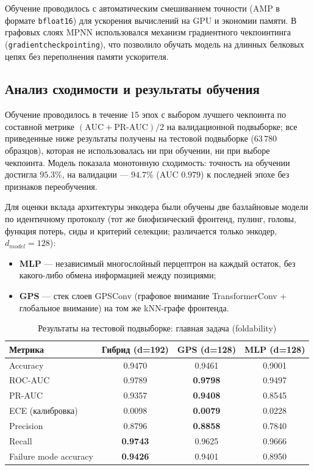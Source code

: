 \documentclass[12pt, a4paper]{article}
\begin{document}
Обучение проводилось с автоматическим смешиванием точности (AMP в формате \texttt{bfloat16}) для ускорения вычислений на GPU и экономии памяти. В графовых слоях MPNN использовался механизм градиентного чекпоинтинга (\texttt{gradient}\-\texttt{checkpointing}), что позволило обучать модель на длинных белковых цепях без переполнения памяти ускорителя.

\subsection{Анализ сходимости и результаты обучения}
Обучение проводилось в течение 15 эпох с выбором лучшего чекпоинта по составной метрике $(\mathrm{AUC} + \mathrm{PR\text{-}AUC})/2$ на валидационной подвыборке; все приведенные ниже результаты получены на тестовой подвыборке ($63\,780$ образцов), которая не использовалась ни при обучении, ни при выборе чекпоинта. Модель показала монотонную сходимость: точность на обучении достигла $95.3\%$, на валидации --- $94.7\%$ (AUC $0.979$) к последней эпохе без признаков переобучения.

Для оценки вклада архитектуры энкодера были обучены две базлайновые модели по идентичному протоколу (тот же биофизический фронтенд, пулинг, головы, функция потерь, сиды и критерий селекции; различается только энкодер, $d_{model}=128$):
\begin{itemize}
    \item \textbf{MLP} --- независимый многослойный перцептрон на каждый остаток, без какого-либо обмена информацией между позициями;
    \item \textbf{GPS} --- стек слоев GPSConv (графовое внимание TransformerConv + глобальное внимание) на том же kNN-графе фронтенда.
\end{itemize}

\begin{table}[h]
\centering
\caption{Результаты на тестовой подвыборке: главная задача (foldability)}
\label{tab:test_results}
\begin{tabular}{lccc}
\toprule
\textbf{Метрика} & \textbf{Гибрид (d=192)} & \textbf{GPS (d=128)} & \textbf{MLP (d=128)} \\
\midrule
Accuracy & 0.9470 & 0.9461 & 0.9001 \\
ROC-AUC & 0.9789 & \textbf{0.9798} & 0.9497 \\
PR-AUC & 0.9357 & \textbf{0.9408} & 0.8545 \\
ECE (калибровка) & 0.0098 & \textbf{0.0079} & 0.0228 \\
Precision & 0.8796 & \textbf{0.8858} & 0.7840 \\
Recall & \textbf{0.9743} & 0.9625 & 0.9666 \\
Failure mode accuracy & \textbf{0.9426} & 0.9401 & 0.8950 \\
\bottomrule
\end{tabular}
\end{table}
\end{document}
